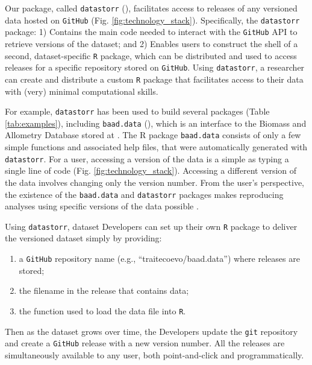 \documentclass[a4paper,num-refs]{assets/oup-contemporary}
\begin{document}
Our package, called \texttt{datastorr} (), facilitates access to releases of any versioned data hosted on \texttt{GitHub} (Fig. \ref{fig:technology_stack}). Specifically, the \texttt{datastorr} package: 1) Contains the main code needed to interact with the \texttt{GitHub} API to retrieve versions of the dataset; and 2) Enables users to construct the shell of a second, dataset-specific \texttt{R} package, which can be distributed and used to access releases for a specific repository stored on \texttt{GitHub}. Using \texttt{datastorr}, a researcher can create and distribute a custom \texttt{R} package that facilitates access to their data with (very) minimal computational skills.

For example, \texttt{datastorr} has been used to build several packages (Table \ref{tab:examples}), including \texttt{baad.data} (), which is an interface to the Biomass and Allometry Database \cite{Falster-2015} stored at . The R package \texttt{baad.data} consists of only a few simple functions and associated help files, that were automatically generated with \texttt{datastorr}. For a user, accessing a version of the data is a simple as typing a single line of code (Fig. \ref{fig:technology_stack}). Accessing a different version of the data involves changing only the version number. From the user's perspective, the existence of the \texttt{baad.data} and \texttt{datastorr} packages makes reproducing analyses using specific versions of the data possible \cite{Duursma-2016,Falster-2016}.


Using \texttt{datastorr}, dataset Developers can set up their own \texttt{R} package to deliver the versioned dataset simply by providing:
\begin{enumerate}
  \item a \texttt{GitHub} repository name (e.g., ``traitecoevo/baad.data'') where releases are stored;
  \item the filename in the release that contains data;
  \item the function used to load the data file into \texttt{R}.
\end{enumerate}

Then as the dataset grows over time, the Developers update the \texttt{git} repository and create a \texttt{GitHub} release with a new version number. All the releases are simultaneously available to any user, both point-and-click and programmatically.
\end{document}
